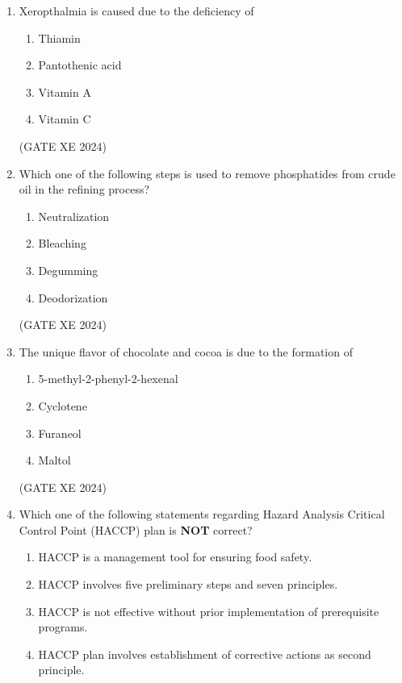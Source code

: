 \documentclass[12pt]{article}
\begin{document}
\begin{enumerate}
(GATE XE 2024)

\item Xeropthalmia is caused due to the deficiency of

\begin{enumerate}
\item Thiamin
\item Pantothenic acid
\item Vitamin A
\item Vitamin C
\end{enumerate}

(GATE XE 2024)

\item Which one of the following steps is used to remove phosphatides from crude oil in the refining process?

\begin{enumerate}
\item Neutralization
\item Bleaching
\item Degumming
\item Deodorization
\end{enumerate}

(GATE XE 2024)

\item The unique flavor of chocolate and cocoa is due to the formation of

\begin{enumerate}
\item 5-methyl-2-phenyl-2-hexenal
\item Cyclotene
\item Furaneol
\item Maltol
\end{enumerate}

(GATE XE 2024)

\item Which one of the following statements regarding Hazard Analysis Critical Control Point (HACCP) plan is \textbf{NOT} correct?

\begin{enumerate}
\item HACCP is a management tool for ensuring food safety.
\item HACCP involves five preliminary steps and seven principles.
\item HACCP is not effective without prior implementation of prerequisite programs.
\item HACCP plan involves establishment of corrective actions as second principle.
\end{enumerate}


\end{enumerate}
\end{document}

